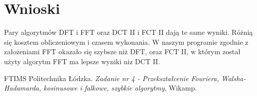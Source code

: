 \documentclass[12pt]{article}
\begin{document}

\section{Wnioski}
Pary algorytmów DFT i FFT oraz DCT II i FCT II dają te same wyniki. Różnią się kosztem obliczeniowym i czasem wykonania. W naszym programie zgodnie z założeniami FFT okazało się szybsze niż DFT, oraz FCT II, w którym został użyty algorytm FFT ma lepsze wyniki niz DCT II.

\begin{thebibliography}{0}
  FTIMS Politechnika Łódzka.
    \textsl{Zadanie nr 4 - Przekształcenie Fouriera, Walsha-Hadamarda, kosinusowe i falkowe, szybkie algorytmy}, Wikamp.
\end{thebibliography}
\end{document}
